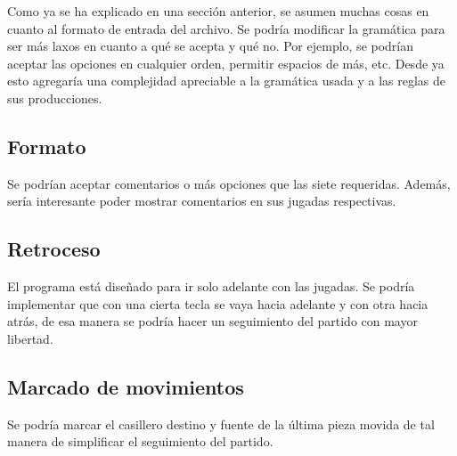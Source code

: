 \documentclass[a4paper,10pt]{article}
\begin{document}
Como ya se ha explicado en una sección anterior, se asumen muchas cosas en cuanto al formato de entrada del archivo. Se podría modificar la gramática para 
ser más laxos en cuanto a qué se acepta y qué no. Por ejemplo, se podrían aceptar las opciones en cualquier orden, permitir espacios de más, etc. Desde ya 
esto agregaría una complejidad apreciable a la gramática usada y a las reglas de sus producciones.

\subsection{ Formato }

Se podrían aceptar comentarios o más opciones que las siete requeridas. Además, sería interesante poder mostrar comentarios en sus jugadas respectivas. 

\subsection{ Retroceso }

El programa está diseñado para ir solo adelante con las jugadas. Se podría implementar que con una cierta tecla se vaya hacia adelante y con otra hacia atrás, 
de esa manera se podría hacer un seguimiento del partido con mayor libertad.

\subsection{ Marcado de movimientos }

Se podría marcar el casillero destino y fuente de la última pieza  movida de tal manera de simplificar el seguimiento del partido.
   
\end{document}
